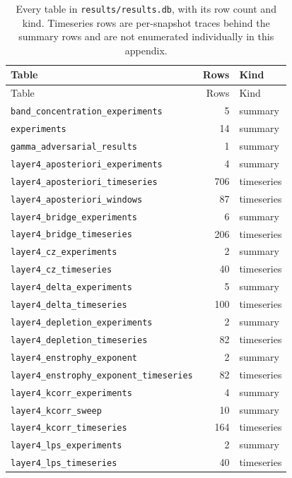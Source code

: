 \begin{center}
\footnotesize
\begin{longtable}{@{}l r l@{}}
\caption[The results database]{Every table in \texttt{results/results.db},
with its row count and kind. Timeseries rows are per-snapshot traces behind
the summary rows and are not enumerated individually in this appendix.}
\label{tab:a1-db}\\
\toprule
Table & Rows & Kind \\
\midrule
\endfirsthead
\toprule
Table & Rows & Kind \\
\midrule
\endhead
\bottomrule
\endfoot
\texttt{band\_concentration\_experiments} & 5 & summary \\
\texttt{experiments} & 14 & summary \\
\texttt{gamma\_adversarial\_results} & 1 & summary \\
\texttt{layer4\_aposteriori\_experiments} & 4 & summary \\
\texttt{layer4\_aposteriori\_timeseries} & 706 & timeseries \\
\texttt{layer4\_aposteriori\_windows} & 87 & timeseries \\
\texttt{layer4\_bridge\_experiments} & 6 & summary \\
\texttt{layer4\_bridge\_timeseries} & 206 & timeseries \\
\texttt{layer4\_cz\_experiments} & 2 & summary \\
\texttt{layer4\_cz\_timeseries} & 40 & timeseries \\
\texttt{layer4\_delta\_experiments} & 5 & summary \\
\texttt{layer4\_delta\_timeseries} & 100 & timeseries \\
\texttt{layer4\_depletion\_experiments} & 2 & summary \\
\texttt{layer4\_depletion\_timeseries} & 82 & timeseries \\
\texttt{layer4\_enstrophy\_exponent} & 2 & summary \\
\texttt{layer4\_enstrophy\_exponent\_timeseries} & 82 & timeseries \\
\texttt{layer4\_kcorr\_experiments} & 4 & summary \\
\texttt{layer4\_kcorr\_sweep} & 10 & summary \\
\texttt{layer4\_kcorr\_timeseries} & 164 & timeseries \\
\texttt{layer4\_lps\_experiments} & 2 & summary \\
\texttt{layer4\_lps\_timeseries} & 40 & timeseries \\

\end{longtable}
\end{center}
